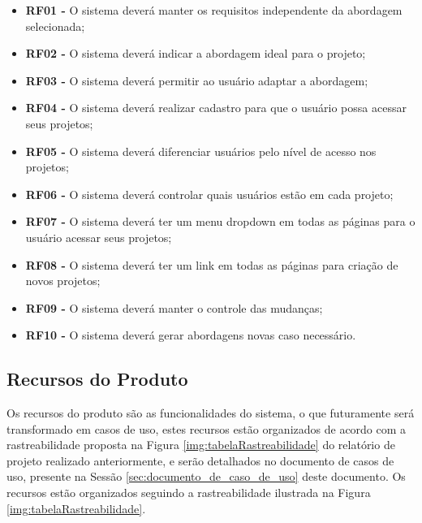 	\begin{itemize}
		\item \textbf{RF01 -} O sistema deverá manter os requisitos independente da abordagem selecionada;
		\item \textbf{RF02 -} O sistema deverá indicar a abordagem ideal para o projeto;
		\item \textbf{RF03 -} O sistema deverá permitir ao usuário adaptar a abordagem;
		\item \textbf{RF04 -} O sistema deverá realizar cadastro para que o usuário possa acessar seus projetos;
		\item \textbf{RF05 -} O sistema deverá diferenciar usuários pelo nível de acesso nos projetos;
		\item \textbf{RF06 -} O sistema deverá controlar quais usuários estão em cada projeto;
		\item \textbf{RF07 -} O sistema deverá ter um menu dropdown em todas as páginas para o usuário acessar seus projetos;
		\item \textbf{RF08 -} O sistema deverá ter um link em todas as páginas para criação de novos projetos;
		\item \textbf{RF09 -} O sistema deverá manter o controle das mudanças;
		\item \textbf{RF10 -} O sistema deverá gerar abordagens novas caso necessário.
	\end{itemize}
\subsection{Recursos do Produto}
\label{subsub:recursos_produto}

Os recursos do produto são as funcionalidades do sistema, o que futuramente será transformado em casos de uso, estes recursos estão organizados de acordo com a rastreabilidade proposta na Figura \ref{img:tabelaRastreabilidade} do relatório de projeto realizado anteriormente, e serão detalhados no documento de casos de uso, presente na Sessão \ref{sec:documento_de_caso_de_uso} deste documento. Os recursos estão organizados seguindo a rastreabilidade ilustrada na Figura \ref{img:tabelaRastreabilidade}.

